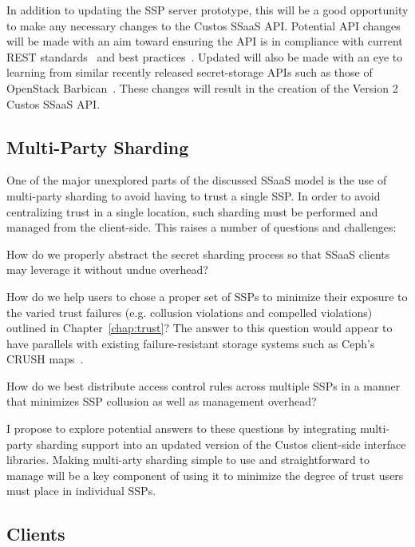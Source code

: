 In addition to updating the SSP server prototype, this will be a good
opportunity to make any necessary changes to the Custos SSaaS
API. Potential API changes will be made with an aim toward ensuring
the API is in compliance with current REST
standards~\cite{ibm-restful} and best
practices~\cite{rest-bestpractices}. Updated will also be made with an
eye to learning from similar recently released secret-storage APIs
such as those of OpenStack Barbican~\cite{openstack-barbican}. These
changes will result in the creation of the Version 2 Custos SSaaS API.

\subsection{Multi-Party Sharding}

One of the major unexplored parts of the discussed SSaaS model is the
use of multi-party sharding to avoid having to trust a single SSP. In
order to avoid centralizing trust in a single location, such sharding
must be performed and managed from the client-side. This raises a
number of questions and challenges:

\begin{packed_item}
\item How do we properly abstract the secret sharding process so that
  SSaaS clients may leverage it without undue overhead?
\item How do we help users to chose a proper set of SSPs to minimize
  their exposure to the varied trust failures (e.g. collusion
  violations and compelled violations) outlined in
  Chapter~\ref{chap:trust}? The answer to this question would appear
  to have parallels with existing failure-resistant storage systems
  such as Ceph's CRUSH maps~\cite{ceph-crush}.
\item How do we best distribute access control rules across multiple
  SSPs in a manner that minimizes SSP collusion as well as management
  overhead?
\end{packed_item}

I propose to explore potential answers to these questions by
integrating multi-party sharding support into an updated version of
the Custos client-side interface libraries. Making multi-arty sharding
simple to use and straightforward to manage will be a key component of
using it to minimize the degree of trust users must place in
individual SSPs.

\subsection{Clients}

